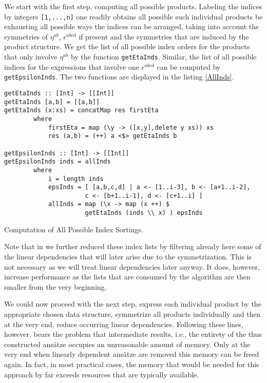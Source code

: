 We start with the first step, computing all possible products. Labeling the indices by integers \texttt{[1,...,n]} one readily obtains all possible such individual products be exhausting all possible ways the indices can be arranged, taking into account the symmetries of $\eta^{ab}$, $\epsilon^{abcd}$ if present and the symmetries that are induced by the product structure. We get the list of all possible index orders for the products that only involve $\eta^{ab}$ by the function \texttt{getEtaInds}.
Similar, the list of all possible indices for the expressions that involve one $\epsilon^{abcd}$ can be computed by \texttt{getEpsilonInds}. The two functions are displayed in the listing \ref{AllInds}.
\begin{listing}[hbt!]
\begin{verbatim}
getEtaInds :: [Int] -> [[Int]]
getEtaInds [a,b] = [[a,b]]
getEtaInds (x:xs) = concatMap res firstEta
        where
            firstEta = map (\y -> ([x,y],delete y xs)) xs
            res (a,b) = (++) a <$> getEtaInds b 

getEpsilonInds :: [Int] -> [[Int]]
getEpsilonInds inds = allInds
        where
            i = length inds 
            epsInds = [ [a,b,c,d] | a <- [1..i-3], b <- [a+1..i-2],
                      c <- [b+1..i-1], d <- [c+1..i] ] 
            allInds = map (\x -> map (x ++) $
                      getEtaInds (inds \\ x) ) epsInds 
\end{verbatim} 
\caption{Computation of All Possible Index Sortings.}\label{AllInds}
\end{listing}

Note that in \cite{sparse-tensor} we further reduced these index lists by filtering already here some of the linear dependencies that will later arise due to the symmetrization. This is not necessary as we will treat linear dependencies later anyway. It does, however, increase performance as the lists that are consumed by the algorithm are then smaller from the very beginning.  

We could now proceed with the next step, express each individual product by the appropriate chosen data structure, symmetrize all products individually and then at the very end, reduce occurring linear dependencies. Following these lines, however, bears the problem that intermediate results, i.e., the entirety of the thus constructed ansätze occupies an unreasonable amount of memory. Only at the very end when linearly dependent ansätze are removed this memory can be freed again. In fact, in most practical cases, the memory that would be needed for this approach by far exceeds resources that are typically available.

